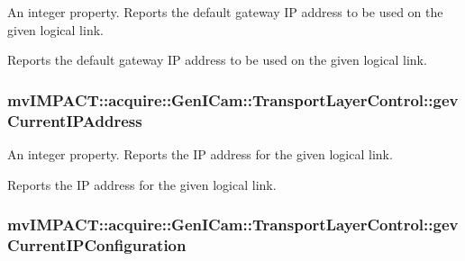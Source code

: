 An integer property. Reports the default gateway I\+P address to be used on the given logical link. 

Reports the default gateway I\+P address to be used on the given logical link. \hypertarget{classmv_i_m_p_a_c_t_1_1acquire_1_1_gen_i_cam_1_1_transport_layer_control_a4628b9bb9f9cb0963f8941f6e823aec7}{
\subsubsection[{gev\+Current\+I\+P\+Address}]{ mv\+I\+M\+P\+A\+C\+T\+::acquire\+::\+Gen\+I\+Cam\+::\+Transport\+Layer\+Control\+::gev\+Current\+I\+P\+Address}}\label{classmv_i_m_p_a_c_t_1_1acquire_1_1_gen_i_cam_1_1_transport_layer_control_a4628b9bb9f9cb0963f8941f6e823aec7}


An integer property. Reports the I\+P address for the given logical link. 

Reports the I\+P address for the given logical link. \hypertarget{classmv_i_m_p_a_c_t_1_1acquire_1_1_gen_i_cam_1_1_transport_layer_control_aca1945229a6695d6c1c6a82549ef1f4c}{
\subsubsection[{gev\+Current\+I\+P\+Configuration}]{ mv\+I\+M\+P\+A\+C\+T\+::acquire\+::\+Gen\+I\+Cam\+::\+Transport\+Layer\+Control\+::gev\+Current\+I\+P\+Configuration}}\label{classmv_i_m_p_a_c_t_1_1acquire_1_1_gen_i_cam_1_1_transport_layer_control_aca1945229a6695d6c1c6a82549ef1f4c}


